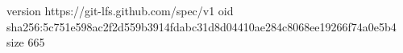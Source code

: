 version https://git-lfs.github.com/spec/v1
oid sha256:5c751e598ac2f2d559b3914fdabc31d8d04410ae284c8068ee19266f74a0e5b4
size 665
